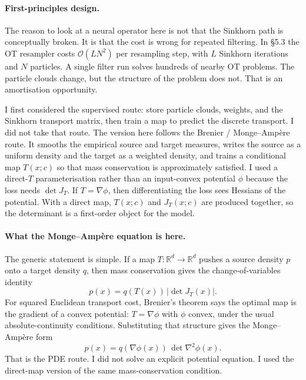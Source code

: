 \paragraph{First-principles design.}
The reason to look at a neural operator here is not that the Sinkhorn path is conceptually broken. It is that the cost is wrong for repeated filtering. In \S5.3 the OT resampler costs $\mathcal{O}(LN^2)$ per resampling step, with $L$ Sinkhorn iterations and $N$ particles. A single filter run solves hundreds of nearby OT problems. The particle clouds change, but the structure of the problem does not. That is an amortisation opportunity.

I first considered the supervised route: store particle clouds, weights, and the Sinkhorn transport matrix, then train a map to predict the discrete transport. I did not take that route. The version here follows the Brenier / Monge--Amp\`ere route. It smooths the empirical source and target measures, writes the source as a uniform density and the target as a weighted density, and trains a conditional map $T(x;c)$ so that mass conservation is approximately satisfied. I used a direct-$T$ parameterisation rather than an input-convex potential $\phi$ because the loss needs $\det J_T$. If $T=\nabla\phi$, then differentiating the loss sees Hessians of the potential. With a direct map, $T(x;c)$ and $J_T(x;c)$ are produced together, so the determinant is a first-order object for the model.

\paragraph{What the Monge--Amp\`ere equation is here.}
The generic statement is simple. If a map $T:\mathbb{R}^d\to\mathbb{R}^d$ pushes a source density $p$ onto a target density $q$, then mass conservation gives the change-of-variables identity
\begin{equation}
    p(x) = q(T(x))\,\left|\det J_T(x)\right|.
\end{equation}
For squared Euclidean transport cost, Brenier's theorem says the optimal map is the gradient of a convex potential: $T=\nabla\phi$ with $\phi$ convex, under the usual absolute-continuity conditions. Substituting that structure gives the Monge--Amp\`ere form
\begin{equation}
    p(x) = q(\nabla\phi(x))\,\det \nabla^2\phi(x).
\end{equation}
That is the PDE route. I did not solve an explicit potential equation. I used the direct-map version of the same mass-conservation condition.

